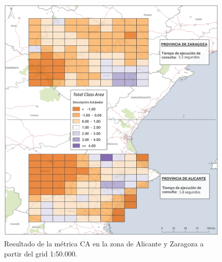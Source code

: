 \begin{figure}
\begin{center}
\includegraphics[width=\textwidth]{ResultadosyDiscusion/Figs/Results/c_50.png}
\caption{Resultado de la métrica CA en la zona de Alicante y Zaragoza a partir del grid 1:50.000.}
\end{center}
\end{figure}

